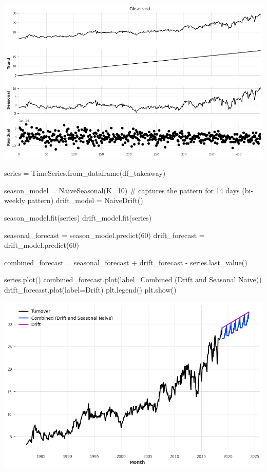 \documentclass[
  11pt,
]{article}
\newenvironment{Shaded}{\begin{snugshade}}{\end{snugshade}}
\newcommand{\CommentTok}[1]{\textcolor[rgb]{0.37,0.37,0.37}{#1}}
\newcommand{\DecValTok}[1]{\textcolor[rgb]{0.68,0.00,0.00}{#1}}
\newcommand{\NormalTok}[1]{\textcolor[rgb]{0.00,0.23,0.31}{#1}}
\newcommand{\OperatorTok}[1]{\textcolor[rgb]{0.37,0.37,0.37}{#1}}
\newcommand{\StringTok}[1]{\textcolor[rgb]{0.13,0.47,0.30}{#1}}
\begin{document}
\includegraphics{hw3_files/figure-pdf/cell-27-output-1.png}

\begin{Shaded}
\begin{Highlighting}[]
\NormalTok{series }\OperatorTok{=}\NormalTok{ TimeSeries.from\_dataframe(df\_takeaway)}

\NormalTok{season\_model }\OperatorTok{=}\NormalTok{ NaiveSeasonal(K}\OperatorTok{=}\DecValTok{10}\NormalTok{) }\CommentTok{\# captures the pattern for 14 days (bi{-}weekly pattern)}
\NormalTok{drift\_model }\OperatorTok{=}\NormalTok{ NaiveDrift()}

\NormalTok{season\_model.fit(series)}
\NormalTok{drift\_model.fit(series)}

\NormalTok{seasonal\_forecast }\OperatorTok{=}\NormalTok{ season\_model.predict(}\DecValTok{60}\NormalTok{)}
\NormalTok{drift\_forecast }\OperatorTok{=}\NormalTok{ drift\_model.predict(}\DecValTok{60}\NormalTok{)}

\NormalTok{combined\_forecast }\OperatorTok{=}\NormalTok{ seasonal\_forecast }\OperatorTok{+}\NormalTok{ drift\_forecast }\OperatorTok{{-}}\NormalTok{ series.last\_value()}

\NormalTok{series.plot()}
\NormalTok{combined\_forecast.plot(label}\OperatorTok{=}\StringTok{\textquotesingle{}Combined (Drift and Seasonal Naive)\textquotesingle{}}\NormalTok{)}
\NormalTok{drift\_forecast.plot(label}\OperatorTok{=}\StringTok{\textquotesingle{}Drift\textquotesingle{}}\NormalTok{)}
\NormalTok{plt.legend()}
\NormalTok{plt.show()}
\end{Highlighting}
\end{Shaded}

\includegraphics{hw3_files/figure-pdf/cell-28-output-1.png}
\end{document}
